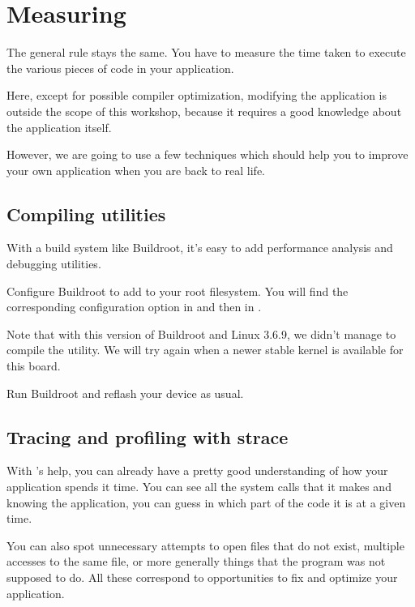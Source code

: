 
\section{Measuring}

The general rule stays the same. You have to measure the time taken to
execute the various pieces of code in your application.

Here, except for possible compiler optimization, modifying the
application is outside the scope of this workshop, because it requires
a good knowledge about the application itself.

However, we are going to use a few techniques which should help you to 
improve your own application when you are back to real life.

\subsection{Compiling utilities}

With a build system like Buildroot, it's easy to add performance
analysis and debugging utilities.

Configure Buildroot to add  to your root
filesystem. You will find the corresponding configuration option in
 and then in .

Note that with this version of Buildroot and Linux 3.6.9, we didn't
manage to compile the  utility. We will try again when a
newer stable kernel is available for this board.

Run Buildroot and reflash your device as usual. 

\subsection{Tracing and profiling with strace}

With 's help, you can already have a pretty good understanding
of how your application spends it time. You can see all the system
calls that it makes and knowing the application, you can guess in which 
part of the code it is at a given time.

You can also spot unnecessary attempts to open files that do not exist,
multiple accesses to the same file, or more generally things that the
program was not supposed to do. All these correspond to opportunities
to fix and optimize your application.

